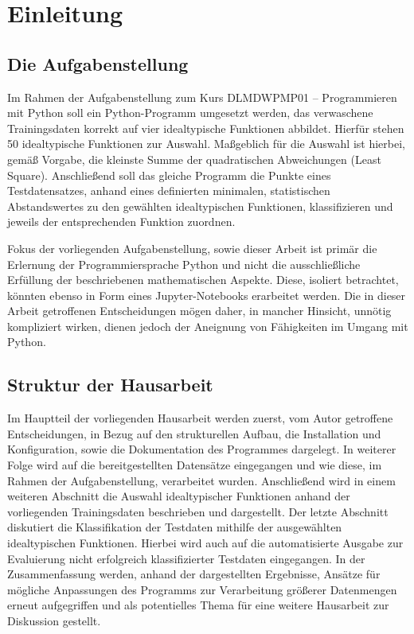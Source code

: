 \chapter{Einleitung}

\section{Die Aufgabenstellung}

Im Rahmen der Aufgabenstellung zum Kurs DLMDWPMP01 – Programmieren mit Python soll ein Python-Programm umgesetzt werden, das verwaschene Trainingsdaten korrekt auf vier idealtypische Funktionen abbildet. Hierfür stehen 50 idealtypische Funktionen zur Auswahl. Maßgeblich für die Auswahl ist hierbei, gemäß Vorgabe, die kleinste Summe der quadratischen Abweichungen (Least Square).
Anschließend soll das gleiche Programm die Punkte eines Testdatensatzes, anhand eines definierten minimalen, statistischen Abstandswertes zu den gewählten idealtypischen Funktionen, klassifizieren und jeweils der entsprechenden Funktion zuordnen.

Fokus der vorliegenden Aufgabenstellung, sowie dieser Arbeit ist primär die Erlernung der Programmiersprache Python und nicht die ausschließliche Erfüllung der beschriebenen mathematischen Aspekte. Diese, isoliert betrachtet, könnten ebenso in Form eines Jupyter-Notebooks erarbeitet werden. Die in dieser Arbeit getroffenen Entscheidungen mögen daher, in mancher Hinsicht, unnötig kompliziert wirken, dienen jedoch der Aneignung von Fähigkeiten im Umgang mit Python.


\section{Struktur der Hausarbeit}

Im Hauptteil der vorliegenden Hausarbeit werden zuerst, vom Autor getroffene Entscheidungen, in Bezug auf den strukturellen Aufbau, die Installation und Konfiguration, sowie die Dokumentation des Programmes dargelegt. 
In weiterer Folge wird auf die bereitgestellten Datensätze eingegangen und wie diese, im Rahmen der Aufgabenstellung, verarbeitet wurden.
Anschließend wird in einem weiteren Abschnitt die Auswahl idealtypischer Funktionen anhand der vorliegenden Trainingsdaten beschrieben und dargestellt.
Der letzte Abschnitt diskutiert die Klassifikation der Testdaten mithilfe der ausgewählten idealtypischen Funktionen. Hierbei wird auch auf die automatisierte Ausgabe zur Evaluierung nicht erfolgreich klassifizierter Testdaten eingegangen.
In der Zusammenfassung werden, anhand der dargestellten Ergebnisse, Ansätze für mögliche Anpassungen des Programms zur Verarbeitung größerer Datenmengen erneut aufgegriffen und als potentielles Thema für eine weitere Hausarbeit zur Diskussion gestellt.

